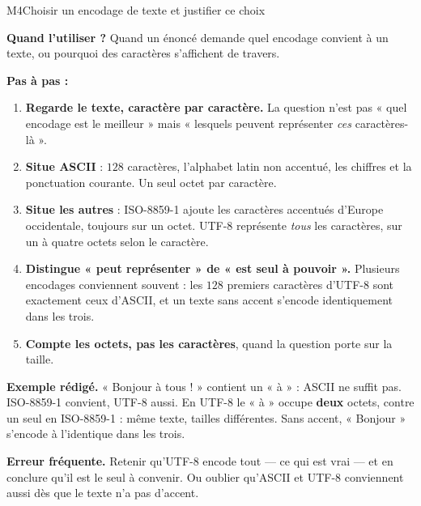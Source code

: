 \begin{fichemethode}{M4}{Choisir un encodage de texte et justifier ce choix}

\textbf{Quand l'utiliser ?} Quand un énoncé demande quel encodage convient à un texte, ou
pourquoi des caractères s'affichent de travers.

\textbf{Pas à pas :}
\begin{enumerate}
  \item \textbf{Regarde le texte, caractère par caractère.} La question n'est pas « quel
        encodage est le meilleur » mais « lesquels peuvent représenter \emph{ces}
        caractères-là ».
  \item \textbf{Situe ASCII} : $128$ caractères, l'alphabet latin non accentué, les chiffres et
        la ponctuation courante. Un seul octet par caractère.
  \item \textbf{Situe les autres} : ISO-8859-1 ajoute les caractères accentués d'Europe
        occidentale, toujours sur un octet. UTF-8 représente \emph{tous} les caractères, sur
        un à quatre octets selon le caractère.
  \item \textbf{Distingue « peut représenter » de « est seul à pouvoir ».} Plusieurs encodages
        conviennent souvent : les $128$ premiers caractères d'UTF-8 sont exactement ceux
        d'ASCII, et un texte sans accent s'encode identiquement dans les trois.
  \item \textbf{Compte les octets, pas les caractères}, quand la question porte sur la taille.
\end{enumerate}

\textbf{Exemple rédigé.} « Bonjour à tous ! » contient un « à » : ASCII ne suffit pas.
ISO-8859-1 convient, UTF-8 aussi. En UTF-8 le « à » occupe \textbf{deux} octets, contre un
seul en ISO-8859-1 : même texte, tailles différentes.
Sans accent, « Bonjour » s'encode à l'identique dans les trois.

\textbf{Erreur fréquente.} Retenir qu'UTF-8 encode tout — ce qui est vrai — et en conclure
qu'il est le seul à convenir. Ou oublier qu'ASCII et UTF-8 conviennent aussi dès que le texte
n'a pas d'accent.

\end{fichemethode}
